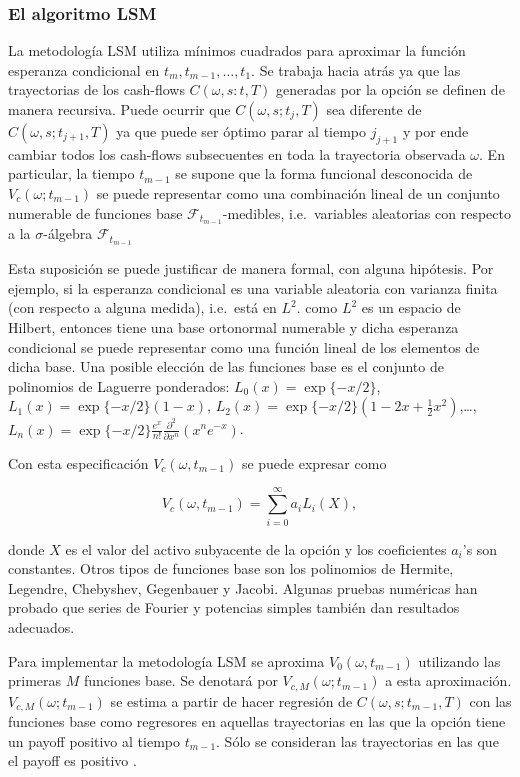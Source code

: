 \documentclass[12pt,reqno,letter]{article}
\begin{document}
	\subsubsection{El algoritmo LSM}\label{el-algoritmo-lsm}
	
	La metodología LSM utiliza mínimos cuadrados para aproximar la función
	esperanza condicional en \(t_m, t_{m-1},\ldots,t_1\). Se trabaja hacia
	atrás ya que las trayectorias de los cash-flows \(C(\omega,s:t,T)\)
	generadas por la opción se definen de manera recursiva. Puede ocurrir
	que \(C(\omega,s;t_j,T)\) sea diferente de \(C(\omega,s;t_{j+1},T)\) ya
	que puede ser óptimo parar al tiempo \(j_{j+1}\) y por ende cambiar
	todos los cash-flows subsecuentes en toda la trayectoria observada
	\(\omega\). En particular, la tiempo \(t_{m-1}\) se supone que la forma
	funcional desconocida de \(V_c(\omega;t_{m-1})\) se puede representar
	como una combinación lineal de un conjunto numerable de funciones base
	\(\mathcal{F}_{t_{m-1}}\)-medibles, i.e.~variables aleatorias con
	respecto a la \(\sigma\)-álgebra \(\mathcal{F}_{t_{m-1}}\)
	
	Esta suposición se puede justificar de manera formal, con alguna
	hipótesis. Por ejemplo, si la esperanza condicional es una variable
	aleatoria con varianza finita (con respecto a alguna medida), i.e.~está
	en \(L^2\). como \(L^2\) es un espacio de Hilbert, entonces tiene una
	base ortonormal numerable y dicha esperanza condicional se puede
	representar como una función lineal de los elementos de dicha base. Una
	posible elección de las funciones base es el conjunto de polinomios de
	Laguerre ponderados: \(L_0(x) = \exp\{-x/2\}\),
	\(L_1(x)=\exp\{-x/2\}(1-x)\),
	\(L_2(x)=\exp\{-x/2\}(1-2x+\frac{1}{2}x^2)\),\ldots{},
	\(L_n(x)=\exp\{-x/2\}\frac{e^x}{n!}\frac{\partial^2}{\partial x^n}(x^ne^{-x})\).
	
	Con esta especificación \(V_c(\omega,t_{m-1})\) se puede expresar como
	
	\[V_c(\omega,t_{m-1})=\sum_{i=0}^{\infty}a_iL_i(X),\]
	
	donde \(X\) es el valor del activo subyacente de la opción y los
	coeficientes \(a_i\)'s son constantes. Otros tipos de funciones base son
	los polinomios de Hermite, Legendre, Chebyshev, Gegenbauer y Jacobi.
	Algunas pruebas numéricas han probado que series de Fourier y potencias
	simples también dan resultados adecuados.
	
	Para implementar la metodología LSM se aproxima \(V_0(\omega,t_{m-1})\)
	utilizando las primeras \(M\) funciones base. Se denotará por
	\(V_{c,M}(\omega;t_{m-1})\) a esta aproximación.
	\(V_{c,M}(\omega;t_{m-1})\) se estima a partir de hacer regresión de
	\(C(\omega,s;t_{m-1},T)\) con las funciones base como regresores en
	aquellas trayectorias en las que la opción tiene un payoff positivo al
	tiempo \(t_{m-1}\). Sólo se consideran las trayectorias en las que el
	payoff es positivo .
	
\end{document}

